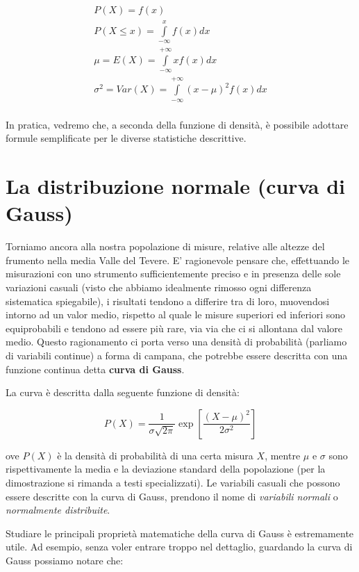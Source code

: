 \documentclass[a4paper,12pt,oneside]{book}
\begin{document}
\[ \begin{array}{l}
P(X) = f(x) \\ 
P(X \le x) = \int\limits_{ - \infty }^x {f(x)} dx \\ 
\mu  = E(X) = \int\limits_{ - \infty }^{ + \infty } {xf(x)} dx \\ 
\sigma ^2  = Var(X) = \int\limits_{ - \infty }^{ + \infty } {\left( {x - \mu } \right)^2 f(x)} dx \\ 
\end{array} \]

In pratica, vedremo che, a seconda della funzione di densità, è possibile adottare formule semplificate per le diverse statistiche descrittive.

\hypertarget{la-distribuzione-normale-curva-di-gauss}{%
\section{La distribuzione normale (curva di Gauss)}\label{la-distribuzione-normale-curva-di-gauss}}

Torniamo ancora alla nostra popolazione di misure, relative alle altezze del frumento nella media Valle del Tevere. E' ragionevole pensare che, effettuando le misurazioni con uno strumento sufficientemente preciso e in presenza delle sole variazioni casuali (visto che abbiamo idealmente rimosso ogni differenza sistematica spiegabile), i risultati tendono a differire tra di loro, muovendosi intorno ad un valor medio, rispetto al quale le misure superiori ed inferiori sono equiprobabili e tendono ad essere più rare, via via che ci si allontana dal valore medio. Questo ragionamento ci porta verso una densità di probabilità (parliamo di variabili continue) a forma di campana, che potrebbe essere descritta con una funzione continua detta \textbf{curva di Gauss}.

La curva è descritta dalla seguente funzione di densità:

\[P(X) = \frac{1}{{\sigma \sqrt {2\pi } }}\exp \left[{\frac{\left( {X - \mu } \right)^2 }{2\sigma ^2 }} \right]\]

ove \(P(X)\) è la densità di probabilità di una certa misura \(X\), mentre \(\mu\) e \(\sigma\) sono rispettivamente la media e la deviazione standard della popolazione (per la dimostrazione si rimanda a testi specializzati). Le variabili casuali che possono essere descritte con la curva di Gauss, prendono il nome di \emph{variabili normali} o \emph{normalmente distribuite}.

Studiare le principali proprietà matematiche della curva di Gauss è estremamente utile. Ad esempio, senza voler entrare troppo nel dettaglio, guardando la curva di Gauss possiamo notare che:
\end{document}

